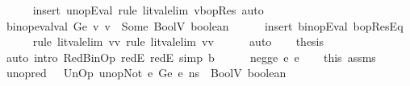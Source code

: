 \begin{isabellebody}
\ \ \ \ \isamarkupfalse%
\ {\isacharparenleft}{\kern0pt}insert\ unopEval{\isacharcomma}{\kern0pt}\ rule\ lit{\isacharunderscore}{\kern0pt}val{\isacharunderscore}{\kern0pt}elim{\isacharbrackleft}{\kern0pt}\ v{\isacharequal}{\kern0pt}bopRes{\isacharbrackright}{\kern0pt}{\isacharparenright}{\kern0pt}\ auto\isanewline
\isanewline
\ \ \isamarkupfalse%
\ {\isachardoublequoteopen}binop{\isacharunderscore}{\kern0pt}eval{\isacharunderscore}{\kern0pt}val\ Ge\ v{}\ v{}\ {\isacharequal}{\kern0pt}\ Some\ {\isacharparenleft}{\kern0pt}BoolV\ boolean{\isacharparenright}{\kern0pt}{\isachardoublequoteclose}\isanewline
\ \ \ \ \isamarkupfalse%
\ {\isacharparenleft}{\kern0pt}insert\ binopEval\ bopResEq{\isacharparenright}{\kern0pt}\isanewline
\ \ \ \ \isamarkupfalse%
\ {\isacharparenleft}{\kern0pt}rule\ lit{\isacharunderscore}{\kern0pt}val{\isacharunderscore}{\kern0pt}elim{\isacharbrackleft}{\kern0pt}\ v{\isacharequal}{\kern0pt}v{}{\isacharbrackright}{\kern0pt}{\isacharsemicolon}{\kern0pt}\ rule\ lit{\isacharunderscore}{\kern0pt}val{\isacharunderscore}{\kern0pt}elim{\isacharbrackleft}{\kern0pt}\ v{\isacharequal}{\kern0pt}v{}{\isacharbrackright}{\kern0pt}{\isacharparenright}{\kern0pt}\isanewline
\ \ \ \ \isamarkupfalse%
\ auto\isanewline
\isanewline
\ \ \isamarkupfalse%
\ {\isacharquery}{\kern0pt}thesis\isanewline
\ \ \ \ \isamarkupfalse%
\ {\isacharparenleft}{\kern0pt}auto\ intro{\isacharcolon}{\kern0pt}\ RedBinOp\ redE{}\ redE{}\ simp{\isacharcolon}{\kern0pt}\ {\isacartoucheopen}b\ {\isacharequal}{\kern0pt}\ {\isacharunderscore}{\kern0pt}{\isacartoucheclose}{\isacharparenright}{\kern0pt}\isanewline
{}\isamarkupfalse%
\isanewline
\ \ \isamarkupfalse%
\ {\isacharparenleft}{\kern0pt}neg{\isacharunderscore}{\kern0pt}ge\ e{}\ e{}{\isacharparenright}{\kern0pt}\isanewline
\ \ \isamarkupfalse%
\ this\ assms\ \isamarkupfalse%
\ unop{\isacharunderscore}{\kern0pt}red{\isacharcolon}{\kern0pt}\ {\isachardoublequoteopen}{\isasymLambda}{\isacharcomma}{\kern0pt}{\isasymGamma}{\isacharcomma}{\kern0pt}{\isasymOmega}\ {\isasymturnstile}\ {\isasymlangle}UnOp\ unop{\isachardot}{\kern0pt}Not\ {\isacharparenleft}{\kern0pt}e{}\ {\isasymguillemotleft}Ge{\isasymguillemotright}\ e{}{\isacharparenright}{\kern0pt}{\isacharcomma}{\kern0pt}\ ns{\isasymrangle}\ {\isasymDown}\ BoolV\ boolean{\isachardoublequoteclose}\ \isamarkupfalse%

\end{isabellebody}
